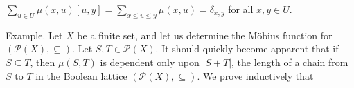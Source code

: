 $\sum_{u \in U} \mu(x, u)[u, y] = \sum_{x \leq u \leq y} \mu(x, u) = \delta_{x,y}$ for all $x, y \in U$.

Example. Let $X$ be a finite set, and let us determine the Möbius function for $(\mathcal{P}(X), \subseteq)$. Let $S, T \in \mathcal{P}(X)$. It should quickly become apparent that if $S \subseteq T$, then $\mu(S, T)$ is dependent only upon $|S + T|$, the length of a chain from $S$ to $T$ in the Boolean lattice $(\mathcal{P}(X), \subseteq)$. We prove inductively that
